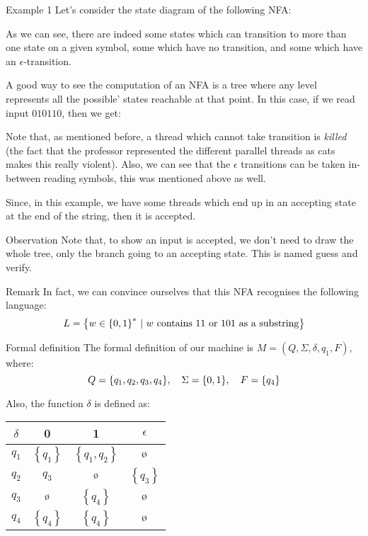 \documentclass[a4paper]{article}
\begin{document}
\begin{parag}{Example 1}
    Let's consider the state diagram of the following NFA:

    As we can see, there are indeed some states which can transition to more than one state on a given symbol, some which have no transition, and some which have an $\epsilon$-transition.

    A good way to see the computation of an NFA is a tree where any level represents all the possible' states reachable at that point. In this case, if we read input $010110$, then we get:

    Note that, as mentioned before, a thread which cannot take transition is \textit{killed} (the fact that the professor represented the different parallel threads as cats makes this really violent). Also, we can see that the $\epsilon$ transitions can be taken in-between reading symbols, this was mentioned above as well.


    Since, in this example, we have some threads which end up in an accepting state at the end of the string, then it is accepted.

    \begin{subparag}{Observation}
        Note that, to show an input is accepted, we don't need to draw the whole tree, only the branch going to an accepting state. This is named guess and verify.
    \end{subparag}
    
    \begin{subparag}{Remark}
        In fact, we can convince ourselves that this NFA recognises the following language: 
        \[L = \left\{w \in \left\{0, 1\right\}^* \suchthat w \text{ contains 11 or 101 as a substring}\right\}\]
    \end{subparag}

    \begin{subparag}{Formal definition}
        The formal definition of our machine is $M = \left(Q, \Sigma, \delta, q_1, F\right)$, where: 
        \[Q = \left\{q_1, q_2, q_3, q_4\right\}, \mathspace \Sigma = \left\{0, 1\right\}, \mathspace F = \left\{q_4\right\}\]
        
        Also, the function $\delta$ is defined as:
        \begin{center}
        \begin{tabular}{c|ccc}
            $\delta$ & 0 & 1 & $\epsilon$ \\
            \hline
            $q_1$ & $\left\{q_1\right\}$ & $\left\{q_1, q_2\right\}$ & $\o$ \\
            $q_2$ & $q_3$ & $\o$ & $\left\{q_3\right\}$ \\
            $q_3$ & $\o$ & $\left\{q_4\right\}$ & $\o$ \\
            $q_4$ & $\left\{q_4\right\}$ & $\left\{q_4\right\}$ & $\o$ \\
        \end{tabular}
        \end{center}


\end{subparag}
\end{parag}
\end{document}
